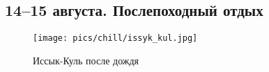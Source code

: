\subsection{14--15 августа. Послепоходный отдых}

\begin{figure}[h!]
	\centering
	\texttt{[image: pics/chill/issyk\_kul.jpg]}
	\caption{Иссык-Куль после дождя}
	\label{fig:issyk_kul.jpg}
\end{figure}